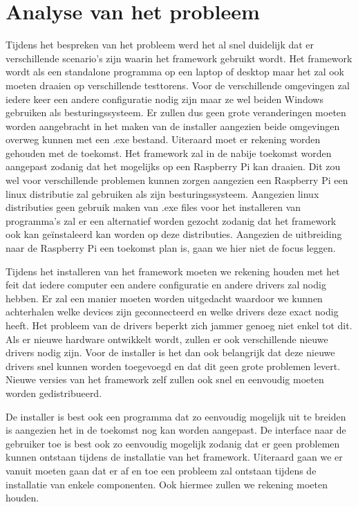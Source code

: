 \documentclass{article}
\begin{document}
\section{Analyse van het probleem} \label{section:analyse}
Tijdens het bespreken van het probleem werd het al snel duidelijk dat er verschillende scenario's zijn waarin het framework gebruikt wordt. 
Het framework wordt als een standalone programma op een laptop of desktop maar het zal ook moeten draaien op verschillende testtorens. 
Voor de verschillende omgevingen zal iedere keer een andere configuratie nodig zijn maar ze wel beiden Windows gebruiken als besturingssysteem. 
Er zullen dus geen grote veranderingen moeten worden aangebracht in het maken van de installer aangezien beide omgevingen overweg kunnen met een .exe bestand. 
Uiteraard moet er rekening worden gehouden met de toekomst. 
Het framework zal in de nabije toekomst worden aangepast zodanig dat het mogelijks op een Raspberry Pi kan draaien.
Dit zou wel voor verschillende problemen kunnen zorgen aangezien een Raspberry Pi een linux distributie zal gebruiken als zijn besturingssysteem.
Aangezien linux distributies geen gebruik maken van .exe files voor het installeren van programma's zal er een alternatief worden gezocht zodanig dat het framework ook kan ge\"instaleerd kan worden op deze distributies.
Aangezien de uitbreiding naar de Raspberry Pi een toekomst plan is, gaan we hier niet de focus leggen.

Tijdens het installeren van het framework moeten we rekening houden met het feit dat iedere computer een andere configuratie en andere drivers zal nodig hebben.
Er zal een manier moeten worden uitgedacht waardoor we kunnen achterhalen welke devices zijn geconnecteerd en welke drivers deze exact nodig heeft.
Het probleem van de drivers beperkt zich jammer genoeg niet enkel tot dit.
Als er nieuwe hardware ontwikkelt wordt, zullen er ook verschillende nieuwe drivers nodig zijn. 
Voor de installer is het dan ook belangrijk dat deze nieuwe drivers snel kunnen worden toegevoegd en dat dit geen grote problemen levert.
Nieuwe versies van het framework zelf zullen ook snel en eenvoudig moeten worden gedistribueerd.

De installer is best ook een programma dat zo eenvoudig mogelijk uit te breiden is aangezien het in de toekomst nog kan worden aangepast. 
De interface naar de gebruiker toe is best ook zo eenvoudig mogelijk zodanig dat er geen problemen kunnen ontstaan tijdens de installatie van het framework.
Uiteraard gaan we er vanuit moeten gaan dat er af en toe een probleem zal ontstaan tijdens de installatie van enkele componenten.
Ook hiermee zullen we rekening moeten houden.
\end{document}
